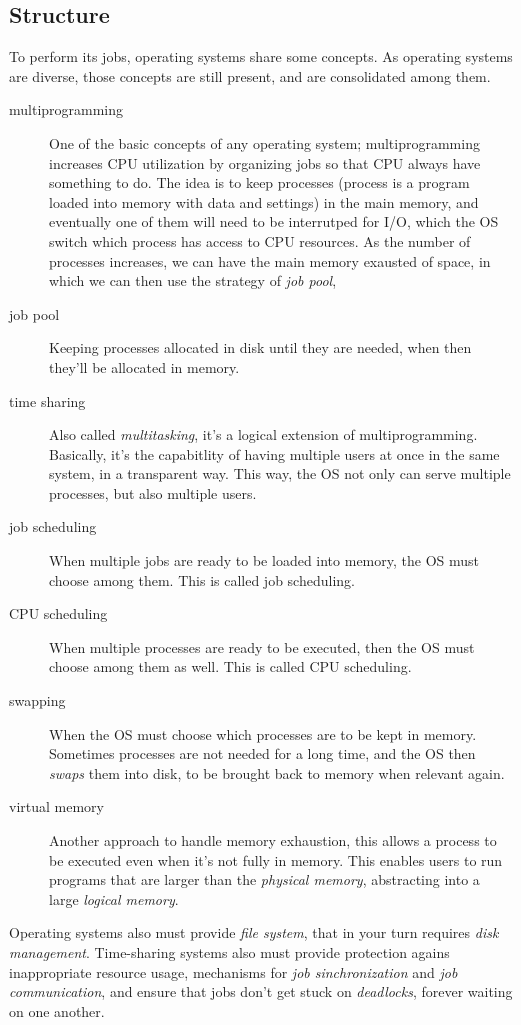 \documentclass{article}
\begin{document}
\subsection{Structure}
To perform its jobs, operating systems share some concepts. As operating systems are diverse, those concepts are still present, and are consolidated among them.
\begin{description}
  \item[multiprogramming] One of the basic concepts of any operating system; multiprogramming increases CPU utilization by organizing jobs so that CPU always have something to do. The idea is to keep processes (process is a program loaded into memory with data and settings) in the main memory, and eventually one of them will need to be interrutped for I/O, which the OS switch which process has access to CPU resources. As the number of processes increases, we can have the main memory exausted of space, in which we can then use the strategy of \emph{job pool},
  \item[job pool] Keeping processes allocated in disk until they are needed, when then they'll be allocated in memory.
  \item[time sharing] Also called \emph{multitasking}, it's a logical extension of multiprogramming. Basically, it's the capabitlity of having multiple users at once in the same system, in a transparent way. This way, the OS not only can serve multiple processes, but also multiple users.
  \item[job scheduling] When multiple jobs are ready to be loaded into memory, the OS must choose among them. This is called job scheduling.
  \item[CPU scheduling] When multiple processes are ready to be executed, then the OS must choose among them as well. This is called CPU scheduling.
  \item[swapping] When the OS must choose which processes are to be kept in memory. Sometimes processes are not needed for a long time, and the OS then \emph{swaps} them into disk, to be brought back to memory when relevant again.
  \item[virtual memory] Another approach to handle memory exhaustion, this allows a process to be executed even when it's not fully in memory. This enables users to run programs that are larger than the \emph{physical memory}, abstracting into a large \emph{logical memory}.
\end{description}

Operating systems also must provide \emph{file system}, that in your turn requires \emph{disk management}. Time-sharing systems also must provide protection agains inappropriate resource usage, mechanisms for \emph{job sinchronization} and \emph{job communication}, and ensure that jobs don't get stuck on \emph{deadlocks}, forever waiting on one another.
\end{document}
